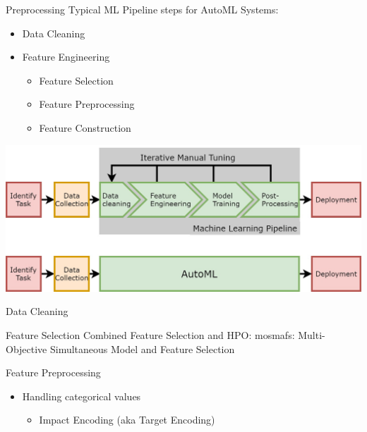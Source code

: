 
\subtitle{Wrap Up}




\maketitle



\begin{frame}{Preprocessing}
    Typical ML Pipeline steps for AutoML Systems:
    \begin{itemize}
      \item Data Cleaning
      \item Feature Engineering
      \begin{itemize}
        \item Feature Selection
        \item Feature Preprocessing
        \item Feature Construction  
      \end{itemize}
    \end{itemize}
    \begin{center}
      \includegraphics[width = 0.5\linewidth]{images/AutoMLPipeline.jpg}  
    \end{center}
\end{frame}

\begin{frame}{Data Cleaning}
    
\end{frame}

\begin{frame}{Feature Selection}
  Combined Feature Selection and HPO: mosmafs: Multi-Objective Simultaneous Model and Feature Selection
    
\end{frame}

\begin{frame}{Feature Preprocessing}
  \begin{itemize}
    \item Handling categorical values
    \begin{itemize}
      \item Impact Encoding (aka Target Encoding)
    \end{itemize}
  \end{itemize}
\end{frame}

